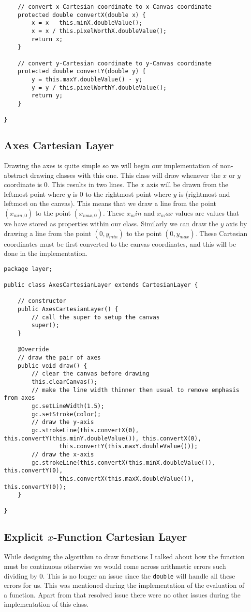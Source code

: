 \documentclass[../../../../main.tex]{subfiles}
\begin{document}
\begin{verbatim}
	// convert x-Cartesian coordinate to x-Canvas coordinate
	protected double convertX(double x) {
		x = x - this.minX.doubleValue();
		x = x / this.pixelWorthX.doubleValue();
		return x;
	}

	// convert y-Cartesian coordinate to y-Canvas coordinate
	protected double convertY(double y) {
		y = this.maxY.doubleValue() - y;
		y = y / this.pixelWorthY.doubleValue();
		return y;
	}

}
\end{verbatim}
\newpage
\subsection{Axes Cartesian Layer}
Drawing the axes is quite simple so we will begin our implementation of non-abstract drawing classes with this one. This class will draw whenever the $x$ or $y$ coordinate is 0. This results in two lines. The $x$ axis will be drawn from the leftmost point where $y$ is 0 to the rightmost point where $y$ is (rightmost and leftmost on the canvas). This means that we draw a line from the point $(x_{min,0})$ to the point $(x_{max,0})$. These $x_min$ and $x_max$ values are values that we have stored as properties within our class. Similarly we can draw the $y$ axis by drawing a line from the point $(0,y_{min})$ to the point $(0,y_{max})$. These Cartesian coordinates must be first converted to the canvas coordinates, and this will be done in the implementation.
\begin{verbatim}
package layer;

public class AxesCartesianLayer extends CartesianLayer {

	// constructor
	public AxesCartesianLayer() {
		// call the super to setup the canvas
		super();
	}

	@Override
	// draw the pair of axes
	public void draw() {
		// clear the canvas before drawing
		this.clearCanvas();
		// make the line width thinner then usual to remove emphasis from axes
		gc.setLineWidth(1.5);
		gc.setStroke(color);
		// draw the y-axis
		gc.strokeLine(this.convertX(0), this.convertY(this.minY.doubleValue()), this.convertX(0),
				this.convertY(this.maxY.doubleValue()));
		// draw the x-axis
		gc.strokeLine(this.convertX(this.minX.doubleValue()), this.convertY(0),
				this.convertX(this.maxX.doubleValue()), this.convertY(0));
	}

}
\end{verbatim}
\newpage
\subsection{Explicit $x$-Function Cartesian Layer}
While designing the algorithm to draw functions I talked about how the function must be continuous otherwise we would come across arithmetic errors such dividing by 0. This is no longer an issue since the \texttt{double} will handle all these errors for us. This was mentioned during the implementation of the evaluation of a function. Apart from that resolved issue there were no other issues during the implementation of this class.
\end{document}
